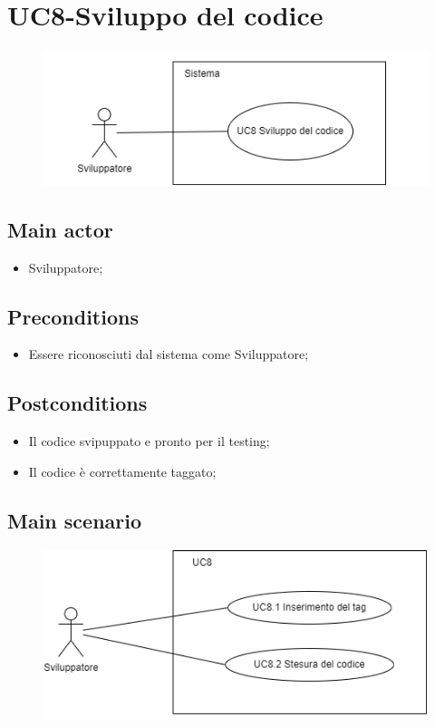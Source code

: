 \documentclass{article}
\begin{document}
\section{UC8-Sviluppo del codice}
    \begin{figure}[h]
      \centering
      \includegraphics{./imgUML/UC8.png}
      \label{fig:immagine}
    \end{figure}
    
    \subsection*{Main actor}
        \begin{itemize}
            \item Sviluppatore;
        \end{itemize}
    
    \subsection*{Preconditions}
        \begin{itemize}
            \item Essere riconosciuti dal sistema come Sviluppatore;
        \end{itemize}
        
    \subsection*{Postconditions} 
        \begin{itemize}
            \item Il codice svipuppato e pronto per il testing;
            \item Il codice è correttamente taggato;  
        \end{itemize}
    
    \subsection*{Main scenario}
        \begin{figure}[h]
          \centering
          \includegraphics{./imgUML/UC8-zoom.png}
          \label{fig:immagine}
        \end{figure}
        
\end{document}
